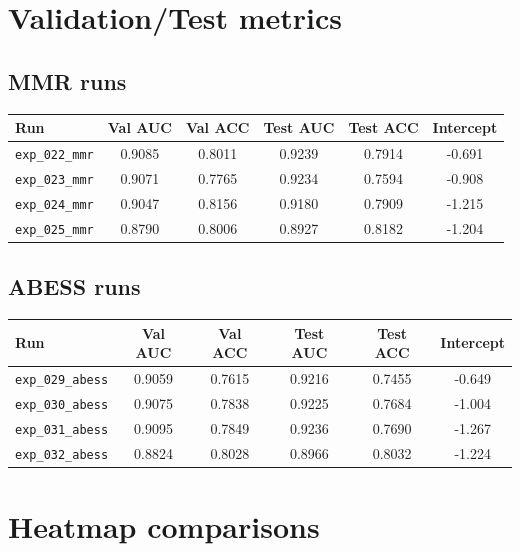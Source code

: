 \documentclass{article}
\begin{document}
\section*{Validation/Test metrics}
\subsection*{MMR runs}
\begin{center}
\begin{tabular}{lccccc}
\toprule
Run & Val AUC & Val ACC & Test AUC & Test ACC & Intercept \\
\midrule
\texttt{exp\_022\_mmr} & 0.9085 & 0.8011 & 0.9239 & 0.7914 & -0.691 \\
\texttt{exp\_023\_mmr} & 0.9071 & 0.7765 & 0.9234 & 0.7594 & -0.908 \\
\texttt{exp\_024\_mmr} & 0.9047 & 0.8156 & 0.9180 & 0.7909 & -1.215 \\
\texttt{exp\_025\_mmr} & 0.8790 & 0.8006 & 0.8927 & 0.8182 & -1.204 \\
\bottomrule
\end{tabular}
\end{center}

\subsection*{ABESS runs}
\begin{center}
\begin{tabular}{lccccc}
\toprule
Run & Val AUC & Val ACC & Test AUC & Test ACC & Intercept \\
\midrule
\texttt{exp\_029\_abess} & 0.9059 & 0.7615 & 0.9216 & 0.7455 & -0.649 \\
\texttt{exp\_030\_abess} & 0.9075 & 0.7838 & 0.9225 & 0.7684 & -1.004 \\
\texttt{exp\_031\_abess} & 0.9095 & 0.7849 & 0.9236 & 0.7690 & -1.267 \\
\texttt{exp\_032\_abess} & 0.8824 & 0.8028 & 0.8966 & 0.8032 & -1.224 \\
\bottomrule
\end{tabular}
\end{center}

\clearpage
\section*{Heatmap comparisons}
\end{document}
